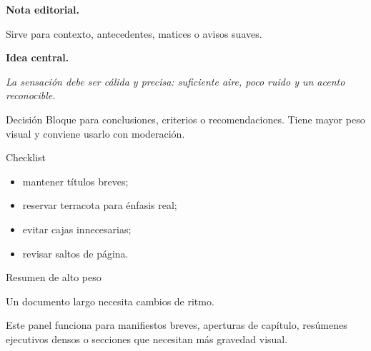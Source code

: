 \documentclass{claudeeditorial}
\begin{document}
\begin{tcbraster}[raster columns=2,raster equal height=rows,raster column skip=10pt]
\begin{claudenote}
\textbf{\UIFont Nota editorial.}

Sirve para contexto, antecedentes, matices o avisos suaves.
\end{claudenote}

\begin{claudequote}
\textbf{\UIFont Idea central.}

\itshape La sensación debe ser cálida y precisa: suficiente aire, poco ruido y un acento reconocible.
\end{claudequote}

\begin{claudedecision}{Decisión}
Bloque para conclusiones, criterios o recomendaciones. Tiene mayor peso visual y conviene usarlo con moderación.
\end{claudedecision}

\begin{claudechecklist}{Checklist}
\begin{itemize}
\item mantener títulos breves;
\item reservar terracota para énfasis real;
\item evitar cajas innecesarias;
\item revisar saltos de página.
\end{itemize}
\end{claudechecklist}
\end{tcbraster}


\begin{claudedarkpanel}{Resumen de alto peso}
{\DisplayFont\fontsize{23}{27}\selectfont\color{claudeIvory}Un documento largo necesita cambios de ritmo.\par}

\vspace{0.5em}
{\color{claudeWarmSilver}Este panel funciona para manifiestos breves, aperturas de capítulo, resúmenes ejecutivos densos o secciones que necesitan más gravedad visual.}

\vspace{0.8em}
\hspace{0.35em}
\hspace{0.35em}
\end{claudedarkpanel}
\end{document}

